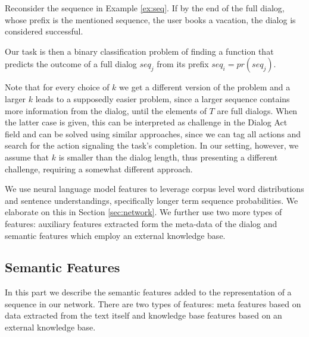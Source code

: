 \begin{example}
Reconsider the sequence in Example \ref{ex:seq}.  
If by the end of the full dialog, whose prefix is the mentioned sequence, 
the user books a vacation, the dialog is considered successful.
\end{example}


Our task is then a binary classification 
problem of finding a function that predicts the outcome 
of a full dialog $seq_j$ from its prefix $seq_i = pr(seq_j)$. 

Note that for every choice of $k$ we get a different 
version of the problem and a larger $k$ leads 
to a supposedly easier problem, since a larger sequence contains 
more information from the dialog, until the elements of $T$ 
are full dialogs. When the latter case is 
given, this can be interpreted as challenge in the Dialog Act field \cite{cs-CL-0006023,DBLP:conf/icassp/JiB05,DBLP:conf/coling/WermterL96} and can be solved using similar approaches, since we 
can tag all actions and search for the action signaling the task's completion. 
In our setting, however, we assume that $k$ is smaller than the dialog 
length, thus presenting a different challenge, requiring a somewhat different approach. 

We use neural language model features to leverage corpus
level word distributions and sentence understandings, 
specifically longer term
sequence probabilities. 
We elaborate on this in Section \ref{sec:network}. 
We further use two more types of features: auxiliary features 
extracted form the meta-data of the dialog and semantic features 
which employ an external knowledge base.


\subsection{Semantic Features}\label{sec:sem} 
In this part we describe the semantic features added 
to the representation of a sequence in our network. 
There are two types of features: meta features based on 
data extracted from the text itself and knowledge base features 
based on an external knowledge base.


